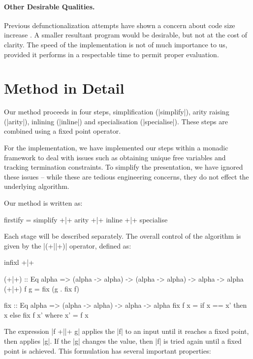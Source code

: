 \documentclass[preprint]{sigplanconf}
\begin{document}
\paragraph{Other Desirable Qualities.} Previous defunctionalization attempts have shown a concern about code size increase \cite{chin:higher_order_removal}. A smaller resultant program would be desirable, but not at the cost of clarity. The speed of the implementation is not of much importance to us, provided it performs in a respectable time to permit proper evaluation.


\section{Method in Detail}
\label{sec:detailed}

Our method proceeds in four steps, simplification (|simplify|), arity raising (|arity|), inlining (|inline|) and specialisation (|specialise|). These steps are combined using a fixed point operator.

For the implementation, we have implemented our steps within a monadic framework to deal with issues such as obtaining unique free variables and tracking termination constraints. To simplify the presentation, we have ignored these issues -- while these are tedious engineering concerns, they do not effect the underlying algorithm.

Our method is written as:

\begin{code}
firstify = simplify +|+ arity +|+ inline +|+ specialise
\end{code}

Each stage will be described separately. The overall control of the algorithm is given by the |(+||+)| operator, defined as:

\begin{code}
infixl +|+

(+|+) :: Eq alpha => (alpha -> alpha) -> (alpha -> alpha) -> alpha -> alpha
(+|+) f g = fix (g . fix f)

fix :: Eq alpha => (alpha -> alpha) -> alpha -> alpha
fix f x = if x == x' then x else fix f x'
    where x' = f x
\end{code}

The expression |f +||+ g| applies the |f| to an input until it reaches a fixed point, then applies |g|. If the |g| changes the value, then |f| is tried again until a fixed point is achieved. This formulation has several important properties:
\end{document}
